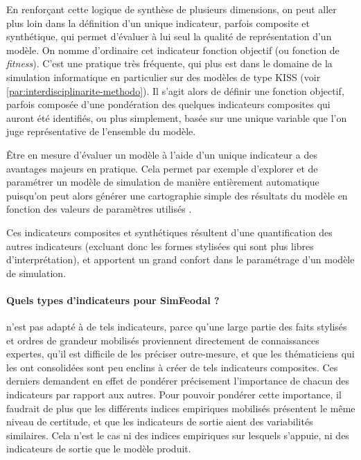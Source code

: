 En renforçant cette logique de synthèse de plusieurs dimensions, on peut aller plus loin dans la définition d'un unique indicateur, parfois composite et synthétique, qui permet d'évaluer à lui seul la qualité de représentation d'un modèle.
On nomme d'ordinaire cet indicateur \og fonction objectif\fg{} (ou \og fonction de \textit{fitness}\fg{}).
C'est une pratique très fréquente, qui plus est dans le domaine de la simulation informatique en particulier sur des modèles de type \og KISS\fg{} (voir \cref{par:interdisciplinarite-methodo}).
Il s'agit alors de définir une \og fonction objectif\fg{}, parfois composée d'une pondération des quelques indicateurs composites qui auront été identifiés, ou plus simplement, basée sur une unique variable que l'on juge représentative de l'ensemble du modèle.

Être en mesure d'évaluer un modèle à l'aide d'un unique indicateur a des avantages majeurs en pratique.
Cela permet par exemple d'explorer et de paramétrer un modèle de simulation de manière entièrement automatique puisqu'on peut alors générer une cartographie simple des résultats du modèle en fonction des valeurs de paramètres utilisés \autocite[voir][par exemple]{cherel_beyond_2015}.

Ces indicateurs composites et synthétiques résultent d'une quantification des autres indicateurs (excluant donc les formes stylisées qui sont plus libres d'interprétation), et apportent un grand confort dans le paramétrage d'un modèle de simulation.

\paragraph{Quels types d'indicateurs pour SimFeodal ?}\label{par:indicateurs-simfeodal}

\simfeodal{} n'est pas adapté à de tels indicateurs, parce qu'une large partie des faits stylisés et ordres de grandeur mobilisés proviennent directement de connaissances expertes, qu'il est difficile de les préciser outre-mesure, et que les thématiciens qui les ont consolidées sont peu enclins à créer de tels indicateurs composites.
Ces derniers demandent en effet de pondérer précisement l'importance de chacun des indicateurs par rapport aux autres.
Pour pouvoir pondérer cette importance, il faudrait de plus que les différents indices empiriques mobilisés présentent le même niveau de certitude, et que les indicateurs de sortie aient des variabilités similaires.
Cela n'est le cas ni des indices empiriques sur lesquels \simfeodal{} s'appuie, ni des indicateurs de sortie que le modèle produit.

